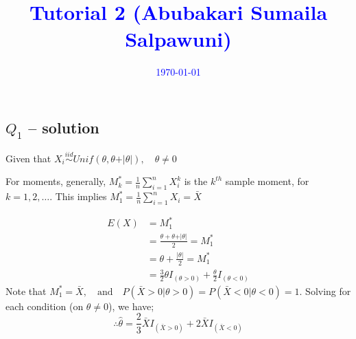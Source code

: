 \documentclass[12pt,a4paper, fleq]{article}
\begin{document}
\title{\textcolor{blue}{Tutorial 2 (Abubakari Sumaila Salpawuni)}}\vskip -3mm

\date{\textcolor{blue}{\today}}
\maketitle

\subsection*{$Q_{1}$ -- solution}
Given that $X_i \overset{iid}{\sim} Unif(\theta, \theta + \vert \theta \vert), \quad \theta \neq 0$

For moments, generally, $M_k^* = \frac1n \sum_{i=1}^n X_i^k$  is the $k^{th}$ sample moment, for $k= 1, 2, \ldots$. This implies $M_1^* = \frac1n\sum_{i=1}^n X_i = \bar{X}$

\begin{equation*}
\begin{split}
E(X) &= M_1^*\\
&= \frac{\theta + \theta + \vert \theta \vert}{2} = M_1^*\\
&= \theta + \frac{\vert \theta \vert}{2} = M_1^*\\
&= \frac32\theta I_{(\theta > 0)} + \frac\theta2 I_{(\theta < 0)}
\end{split}
\end{equation*}
Note that $M_1^* = \bar{X},\quad \mbox{and}\quad  P(\bar{X} >0 \vert \theta > 0) =P(\bar{X} < 0 \vert \theta < 0) = 1$. Solving for each condition (on $\theta \neq 0$), we have;
\begin{equation*}
\therefore \hat{\theta} = \frac23\bar{X} I_{(\bar{X}>0)} + 2\bar{X} I_{(\bar{X} < 0)}
\end{equation*} 
\end{document}
